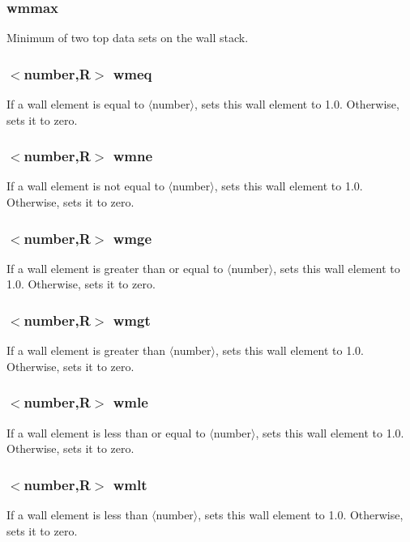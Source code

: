 \documentclass[a4paper,10pt]{report}
\begin{document}
\subsubsection{wmmax}\label{sec:wmmax}
Minimum of two top data sets on the wall stack.

\subsubsection{$<$number,{\bf R}$>$ wmeq}\label{sec:wmeq}
If a wall element is equal to $\langle$number$\rangle$, sets this wall element to 1.0.
Otherwise, sets it to zero.

\subsubsection{$<$number,{\bf R}$>$ wmne}\label{sec:wmne}
If a wall element is not equal to $\langle$number$\rangle$, sets this wall element to 1.0.
Otherwise, sets it to zero.

\subsubsection{$<$number,{\bf R}$>$ wmge}\label{sec:wmge}
If a wall element is greater than or equal to $\langle$number$\rangle$, sets this wall element to 1.0.
Otherwise, sets it to zero.

\subsubsection{$<$number,{\bf R}$>$ wmgt}\label{sec:wmgt}
If a wall element is greater than $\langle$number$\rangle$, sets this wall element to 1.0.
Otherwise, sets it to zero.

\subsubsection{$<$number,{\bf R}$>$ wmle}\label{sec:wmle}
If a wall element is less than or equal to $\langle$number$\rangle$, sets this wall element to 1.0.
Otherwise, sets it to zero.

\subsubsection{$<$number,{\bf R}$>$ wmlt}\label{sec:wmlt}
If a wall element is less than $\langle$number$\rangle$, sets this wall element to 1.0.
Otherwise, sets it to zero.
\end{document}
